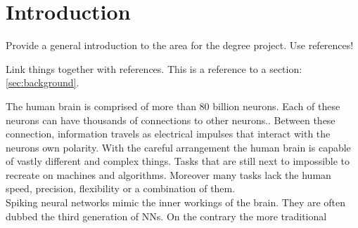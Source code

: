 \chapter{Introduction}

Provide a general introduction to the area for the degree project. Use references!

Link things together with references. This is a reference to a section: \ref{sec:background}.



The human brain is comprised of more than 80 billion neurons. Each of these neurons can have thousands of connections to other neurons.. Between these connection, information travels as electrical impulses that interact with the neurons own polarity. With the careful arrangement the human brain is capable of vastly different and complex things. Tasks that are still next to impossible to recreate on machines and algorithms. Moreover many tasks lack the human speed, precision, flexibility or a combination of them.\\



Spiking neural networks mimic the inner workings of the brain. They are often dubbed the third generation of \acp{NN}. On the contrary the more traditional

